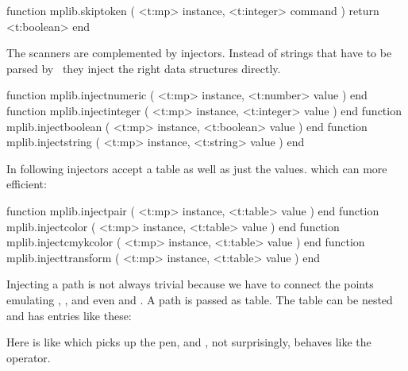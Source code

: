 \starttyping[option=LUA]
function mplib.skiptoken ( <t:mp> instance, <t:integer> command )
    return <t:boolean>
end
\stoptyping

\stopsection

\startsection[title=Injectors]

The scanners are complemented by injectors. Instead of strings that have to be
parsed by \METAPOST\ they inject the right data structures directly.

\starttyping[option=LUA]
function mplib.injectnumeric ( <t:mp> instance, <t:number>  value ) end
function mplib.injectinteger ( <t:mp> instance, <t:integer> value ) end
function mplib.injectboolean ( <t:mp> instance, <t:boolean> value ) end
function mplib.injectstring  ( <t:mp> instance, <t:string>  value ) end
\stoptyping

In following injectors accept a table as well as just the values. which can more
efficient:

\starttyping[option=LUA]
function mplib.injectpair      ( <t:mp> instance, <t:table> value ) end
function mplib.injectcolor     ( <t:mp> instance, <t:table> value ) end
function mplib.injectcmykcolor ( <t:mp> instance, <t:table> value ) end
function mplib.injecttransform ( <t:mp> instance, <t:table> value ) end
\stoptyping

Injecting a path is not always trivial because we have to connect the points
emulating , , \type [option=MP]
{---} and even \type [option=MP] {&&} and . A path is
passed as table. The table can be nested and has entries like these:

\stoptyping

Here  is like \type [option=MP] {&&} which picks up the
pen, and , not surprisingly, behaves like the  operator.

